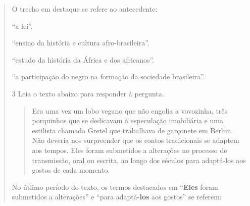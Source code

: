 {\begin{quote}
{O trecho em destaque se refere ao antecedente:

\begin{escolha}
  
  \item ``a lei''.
  
  \item ``ensino da história e cultura afro-brasileira''.
  
  \item ``estudo da história da África e dos africanos''.
  
  \item ``a participação do negro na formação da sociedade brasileira''.

\end{escolha}


\num{3} Leia o texto abaixo para responder à pergunta.

\begin{quote}

Era uma vez um lobo vegano que não engolia a vovozinha, três
porquinhos que se dedicavam à especulação imobiliária e uma estilista
chamada Gretel que trabalhava de garçonete em Berlim. Não deveria nos
surpreender que os contos tradicionais se adaptem aos tempos. Eles foram
submetidos a alterações no processo de transmissão, oral ou escrita, ao
longo dos séculos para adaptá-los aos gostos de cada momento.

\end{quote}


No útlimo período do texto, os termos destacados em ``\textbf{Eles} foram
submetidos a alterações'' e ``para adaptá-\textbf{los} aos gostos'' se referem:

\begin{escolha}


\end{escolha}}
\end{quote}}
